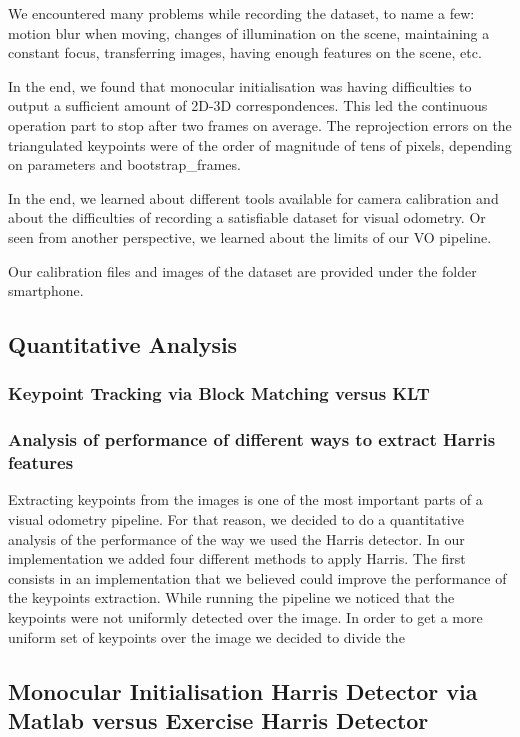 We encountered many problems while recording the dataset, to name a few: motion blur when moving, changes of illumination on the scene,
maintaining a constant focus, transferring images, having enough features on the scene, etc.

In the end, we found that monocular initialisation was having difficulties to output a sufficient amount of 2D-3D correspondences.
This led the continuous operation part to stop after two frames on average. The reprojection errors on the triangulated keypoints were of
the order of magnitude of tens of pixels, depending on parameters and bootstrap\_frames.

In the end, we learned about different tools available for camera calibration and about the difficulties of recording a satisfiable dataset
for visual odometry. Or seen from another perspective, we learned about the limits of our VO pipeline.

Our calibration files and images of the dataset are provided under the folder smartphone.








\subsection{Quantitative Analysis}
\subsubsection{Keypoint Tracking via Block Matching versus KLT}

\subsubsection{Analysis of performance of different ways to extract Harris features}
Extracting keypoints from the images is one of the most important parts of a visual odometry pipeline. For that reason, we
decided to do a quantitative analysis of the performance of the way we used the Harris detector.
In our implementation we added four different methods to apply Harris.
The first consists in an implementation that we believed could improve the performance of the keypoints extraction.
While running the pipeline we noticed that the keypoints were not uniformly detected over the image.
In order to get a more uniform set of keypoints over the image we decided to divide the



\subsection{Monocular Initialisation Harris Detector via Matlab versus Exercise Harris Detector}

